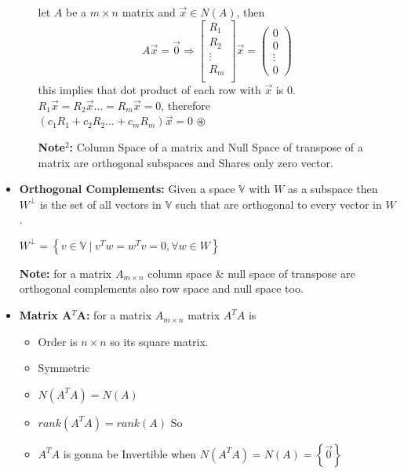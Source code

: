 \documentclass[a4paper,11pt]{article}
\numberwithin{equation}{section}
\begin{document}
\begin{itemize}
\begin{itemize}
\begin{center}
    let $A$ be a $m\times n$ matrix and $\vec{x}\in N(A)$, then
    \[A\vec{x}=\vec{0} \Longrightarrow
    \begin{bmatrix}
        R_1\\R_2\\\vdots\\ R_m\\
    \end{bmatrix}\vec{x}=
    \begin{pmatrix}
       0\\0\\\vdots\\0
    \end{pmatrix}
    \]
    this implies that dot product of each row with $\vec{x}$ is $0$.\\
    \vspace{4pt}
    $R_1\vec{x}=R_2\vec{x}\dots=R_m\vec{x}=0$, therefore \\
    $(c_1R_1+c_2R_2\dots+c_mR_m)\vec{x}=0$ \hspace{3pt} $\circledast$

\end{center}

\textbf{Note$^2$: }Column Space of a matrix and Null Space of transpose of a matrix are orthogonal subspaces and Shares only zero vector.\\
\end{itemize}

\item \textbf{Orthogonal Complements: }Given a space $\mathbb{V}$ with $W$ as a subspace then $W^\perp$ is the set of all vectors in $\mathbb{V}$ such that are orthogonal to every vector in $W$.

\begin{center}
    $W^\perp=\left\{v\in \mathbb{V} \hspace{3pt} \vert\hspace{3pt} v^Tw=w^Tv=0 ,\forall w\in W\right\}$
\end{center}

\textbf{Note: }for a matrix $A_{m\times n}$ column space \& null space of transpose are orthogonal complements also row space and null space too. 

\item \textbf{Matrix A$^T$A: } for a matrix $A_{m\times n}$ matrix $A^TA$ is 
\begin{itemize}
    \item Order is $n\times n$ so its square matrix.
    \item Symmetric
    \item $N(A^TA)=N(A)$
    \item $rank(A^TA)=rank(A)$ So
    \item $A^TA$ is gonna be Invertible when $N(A^TA)=N(A)=\left\{\vec{0}\right\}$
\end{itemize}


\end{itemize}
\end{document}
